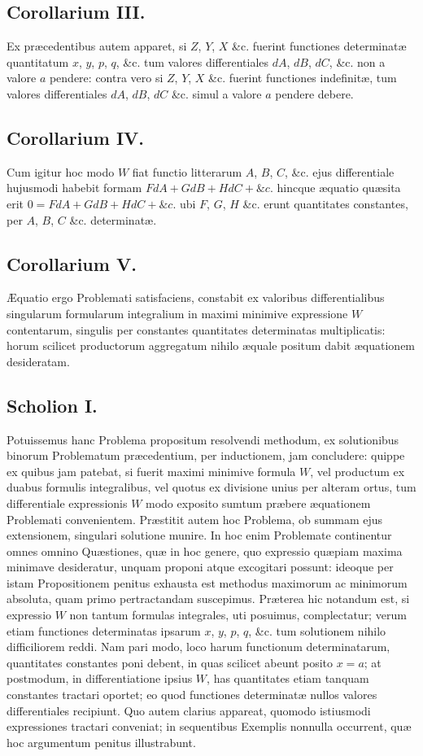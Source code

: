 \subsection*{Corollarium III.}
Ex præcedentibus autem apparet, si $Z$, $Y$, $X$ \&c. fuerint functiones determinatæ quantitatum $x$, $y$, $p$, $q$, \&c. tum valores differentiales $dA$, $dB$, $dC$, \&c. non a valore $a$ pendere: contra vero si $Z$, $Y$, $X$ \&c. fuerint functiones indefinitæ, tum valores differentiales $dA$, $dB$, $dC$ \&c. simul a valore $a$ pendere debere.
\subsection*{Corollarium IV.}
Cum igitur hoc modo $W$ fiat functio litterarum $A$, $B$, $C$, \&c. ejus differentiale hujusmodi habebit formam $FdA+GdB+HdC+\&c.$ hincque æquatio quæsita erit $0=FdA+GdB+HdC+\&c.$ ubi $F$, $G$, $H$ \&c. erunt quantitates constantes, per $A$, $B$, $C$ \&c. determinatæ.
\subsection*{Corollarium V.}
Æquatio ergo Problemati satisfaciens, constabit ex valoribus differentialibus singularum formularum integralium in maximi minimive expressione $W$ contentarum, singulis per constantes quantitates determinatas multiplicatis: horum scilicet productorum aggregatum nihilo æquale positum dabit æquationem desideratam.
\subsection*{Scholion I.}
Potuissemus hanc Problema propositum resolvendi methodum, ex solutionibus binorum Problematum præcedentium, per inductionem, jam concludere: quippe ex quibus jam patebat, si fuerit maximi minimive formula $W$, vel productum ex duabus formulis integralibus, vel quotus ex divisione unius per alteram ortus, tum differentiale expressionis $W$ modo exposito sumtum præbere æquationem Problemati convenientem. Præstitit autem hoc Problema, ob summam ejus extensionem, singulari solutione munire. In hoc enim Problemate continentur omnes omnino Quæstiones, quæ in hoc genere, quo expressio quæpiam maxima minimave desideratur, unquam proponi atque excogitari possunt: ideoque per istam Propositionem penitus exhausta est methodus maximorum ac minimorum absoluta, quam primo pertractandam suscepimus. Præterea hic notandum est, si expressio $W$ non tantum formulas integrales, uti posuimus, complectatur; verum etiam functiones determinatas ipsarum $x$, $y$, $p$, $q$, \&c. tum solutionem nihilo difficiliorem reddi. Nam pari modo, loco harum functionum determinatarum, quantitates constantes poni debent, in quas scilicet abeunt posito $x=a$; at postmodum, in differentiatione ipsius $W$, has quantitates etiam tanquam constantes tractari oportet; eo quod functiones determinatæ nullos valores differentiales recipiunt. Quo autem clarius appareat, quomodo istiusmodi expressiones tractari conveniat; in sequentibus Exemplis nonnulla occurrent, quæ hoc argumentum penitus illustrabunt.
